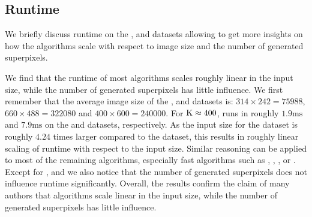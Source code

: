\subsection{Runtime}
\label{subsec:appendix-experiments-robustness}

We briefly discuss runtime on the \SBD, \SUNRGBD and \Fash datasets allowing to get
more insights on how the algorithms scale with respect to image size and the
number of generated superpixels.

We find that the runtime of most algorithms scales roughly linear in the input size, while the
number of generated superpixels has little influence. We first remember that
the average image size of the \SBD, \SUNRGBD and \Fash datasets is: $314 \times 242 = 75988$,
$660 \times 488 = 322080$ and $400 \times 600 = 240000$. For $\text{K} \approx 400$, \W
runs in roughly $1.9\text{ms}$ and $7.9\text{ms}$ on the \SBD and \SUNRGBD datasets, respectively.
As the input size for the \SUNRGBD dataset is roughly $4.24$ times larger compared to the
\SBD dataset, this results in roughly linear scaling of runtime with respect to the input size.
Similar reasoning can be applied to most of the remaining algorithms, especially
fast algorithms such as \CW, \PF, \preSLIC, \MSS or \SLIC. Except for \RW, \QS and \SEAW
we also notice that the number of generated superpixels does not influence runtime significantly.
Overall, the results confirm the claim of many authors that algorithms scale
linear in the input size, while the number of generated superpixels has little influence.
